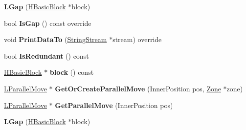 \begin{DoxyCompactItemize}
\item 
{\bfseries L\+Gap} (\hyperlink{classv8_1_1internal_1_1_h_basic_block}{H\+Basic\+Block} $\ast$block)\hypertarget{classv8_1_1internal_1_1_l_gap_a065fcd3080fabb91cccfc541f7cf90f0}{}\label{classv8_1_1internal_1_1_l_gap_a065fcd3080fabb91cccfc541f7cf90f0}

\item 
bool {\bfseries Is\+Gap} () const  override\hypertarget{classv8_1_1internal_1_1_l_gap_aac0749ec3212db7ad37d7fcb6a7a31fd}{}\label{classv8_1_1internal_1_1_l_gap_aac0749ec3212db7ad37d7fcb6a7a31fd}

\item 
void {\bfseries Print\+Data\+To} (\hyperlink{classv8_1_1internal_1_1_string_stream}{String\+Stream} $\ast$stream) override\hypertarget{classv8_1_1internal_1_1_l_gap_ad22b85643ee0ccf9a50f8cc0e73abc19}{}\label{classv8_1_1internal_1_1_l_gap_ad22b85643ee0ccf9a50f8cc0e73abc19}

\item 
bool {\bfseries Is\+Redundant} () const \hypertarget{classv8_1_1internal_1_1_l_gap_afd74524d060224489b5e7095e3354e1e}{}\label{classv8_1_1internal_1_1_l_gap_afd74524d060224489b5e7095e3354e1e}

\item 
\hyperlink{classv8_1_1internal_1_1_h_basic_block}{H\+Basic\+Block} $\ast$ {\bfseries block} () const \hypertarget{classv8_1_1internal_1_1_l_gap_a14ee6777d69e95f0c17ce3dcc0c6431e}{}\label{classv8_1_1internal_1_1_l_gap_a14ee6777d69e95f0c17ce3dcc0c6431e}

\item 
\hyperlink{classv8_1_1internal_1_1_l_parallel_move}{L\+Parallel\+Move} $\ast$ {\bfseries Get\+Or\+Create\+Parallel\+Move} (Inner\+Position pos, \hyperlink{classv8_1_1internal_1_1_zone}{Zone} $\ast$zone)\hypertarget{classv8_1_1internal_1_1_l_gap_afa07f91a1bdbab70770e57c45a4c93cd}{}\label{classv8_1_1internal_1_1_l_gap_afa07f91a1bdbab70770e57c45a4c93cd}

\item 
\hyperlink{classv8_1_1internal_1_1_l_parallel_move}{L\+Parallel\+Move} $\ast$ {\bfseries Get\+Parallel\+Move} (Inner\+Position pos)\hypertarget{classv8_1_1internal_1_1_l_gap_a80a7bd7cd4beef3be42928544646c5fb}{}\label{classv8_1_1internal_1_1_l_gap_a80a7bd7cd4beef3be42928544646c5fb}

\item 
{\bfseries L\+Gap} (\hyperlink{classv8_1_1internal_1_1_h_basic_block}{H\+Basic\+Block} $\ast$block)\hypertarget{classv8_1_1internal_1_1_l_gap_a065fcd3080fabb91cccfc541f7cf90f0}{}\label{classv8_1_1internal_1_1_l_gap_a065fcd3080fabb91cccfc541f7cf90f0}


\end{DoxyCompactItemize}
